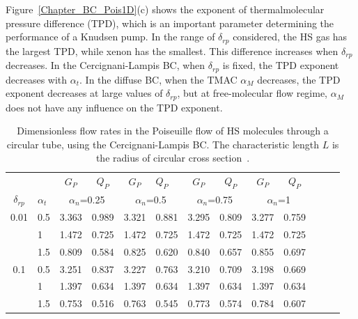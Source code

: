 Figure~\ref{Chapter_BC_Pois1D}(c) shows the exponent of thermalmolecular pressure difference  (TPD), which is an important parameter determining the performance of a Knudsen pump. 
In the range of $\delta_{rp}$ considered, the HS gas has the largest TPD, while xenon has the smallest. This difference increases when $\delta_{rp} $ decreases. In the Cercignani-Lampis  BC, when $\delta_{rp}$ is fixed, the TPD exponent decreases with $\alpha _{t}$. In the diffuse  BC, when the TMAC $\alpha _{M}$ decreases, the TPD exponent decreases at large values of $\delta_{rp}$, but at free-molecular flow regime, $\alpha _{M}$ does not have any influence on the TPD exponent.


\begin{table}[pt]
	\centering
	\caption{Dimensionless flow rates in the Poiseuille flow of HS molecules through a circular tube, using the Cercignani-Lampis BC.  The characteristic length $L$ is the radius of circular cross section~\cite{WuStruchtrupJFM2017}.}
	\begin{tabular}{clccclccccccc}
		\hline
		&  & ${G}_P$ & ${Q}_P$ & ${G}_P$ & ${Q}_P$ & ${G}_P$ & ${Q}_P$ & ${G}_P$
		& ${Q}_P$  \\ 
		$\delta_{rp}$ & $\alpha_t$ & \multicolumn{2}{c}{$\alpha_n$=0.25} & 
		\multicolumn{2}{c}{$\alpha_n$=0.5} & \multicolumn{2}{c}{$\alpha_n$=0.75} & 
		\multicolumn{2}{c}{$\alpha_n$=1}   \\
		\hline 
		0.01 & 0.5 & 3.363 & 0.989 & 3.321 & 0.881 & 3.295 & 0.809 & 3.277 & 0.759   \\ 
		& 1 & 1.472 & 0.725 & 1.472 & 0.725 & 1.472 & 0.725 & 1.472 & 0.725 
		\\ 
		& 1.5 & 0.809 & 0.584 & 0.825 & 0.620 & 0.840 & 0.657 & 0.855 & 0.697   \\ 
		0.1 & 0.5 & 3.251 & 0.837 & 3.227 & 0.763 & 3.210 & 0.709 & 3.198 & 0.669   \\ 
		& 1 & 1.397 & 0.634 & 1.397 & 0.634 & 1.397 & 0.634 & 1.397 & 0.634 
		\\ 
		& 1.5 & 0.753 & 0.516 & 0.763 & 0.545 & 0.773 & 0.574 & 0.784 & 0.607   \\ 

\end{tabular}
\end{table}
